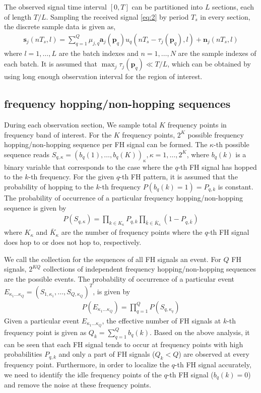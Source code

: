 \documentclass[journal,10pt]{IEEEtran}
\begin{document}
The observed signal time interval $[0,T]$ can be partitioned into $L$ sections, each of length $T/L$. Sampling the received signal \eqref{eq:2} by period $T_s$ in every section, the discrete sample data is given as,
\begin{align}\label{eq:5}
    \boldsymbol{s}_j(nT_s,l)=\sum_{q=1}^{Q} \mu_{j,q} \boldsymbol{a}_j(\boldsymbol{p}_q)u_q(nT_s-\tau_j(\boldsymbol{p}_q),l)+\boldsymbol{n}_j(nT_s,l)
\end{align}
where $l=1,\dots,L$ are the batch indexes and $n=1,\dots,N$ are the sample indexes of each batch. It is assumed that $\max_j \tau_j(\boldsymbol{p}_q)\ll T/L$, which can be obtained by using long enough observation interval for 
the region of interest. 

\subsection{frequency hopping/non-hopping sequences}
During each observation section, We sample total $K$ frequency points in frequency band of interest. For the $K$ frequency points, $2^K$ possible frequency hopping/non-hopping sequence per FH signal can be formed.
The $\kappa$-th possible sequence reads $S_{q,\kappa}=(b_q(1),\dots, b_q(K))_\kappa,\kappa=1,\dots,2^K$, where $b_q(k)$ is a binary variable that corresponds to the case 
where the $q$-th FH signal has hopped to the $k$-th frequency. For the given $q$-th FH pattern, it is assumed that the probability of hopping to the $k$-th frequency $P(b_q(k)=1)=P_{q,k}$ is constant.
The probability of occurrence of a particular frequency hopping/non-hopping sequence is given by
\begin{align}\label{eq:6}
    P(S_{q,\kappa})=\prod_{k\in K_\kappa}P_{q,k}\prod_{\bar{k}\in \bar{K}_\kappa}(1-P_{q,\bar{k}})
\end{align}
where $K_\kappa$ and $\bar{K}_\kappa$ are the number of frequency points where the $q$-th FH signal does hop to or does not hop to, respectively.

We call the collection for the sequences of all FH signals an event. For $Q$ FH signals, $2^{KQ}$ collections of independent frequency hopping/non-hopping sequences are the possible events.
The probability of occurrence of a particular event $E_{\kappa_1\dots\kappa_Q}=(S_{1,\kappa_1},\dots,S_{Q,\kappa_Q})^T$, is given by 
\begin{align}\label{eq:7}
    P(E_{\kappa_1\dots\kappa_Q})=\prod_{q=1}^Q P(S_{q,\kappa_q})
\end{align}
Given a particular event $E_{\kappa_1\dots\kappa_Q}$, the effective number of FH signals at $k$-th frequency point is given as $Q_k=\sum_{q=1}^Q b_q(k)$. 
Based on the above analysis, it can be seen that each FH signal tends to occur at frequency points with high probabilities $P_{q,k}$ and only a part of FH signals ($Q_k<Q$) are observed at every frequency point.
Furthermore, in order to localize the $q$-th FH signal accurately, we need to identify the idle frequency points of the $q$-th FH signal ($b_q(k)=0$) and remove the noise at these frequency points.
\end{document}

